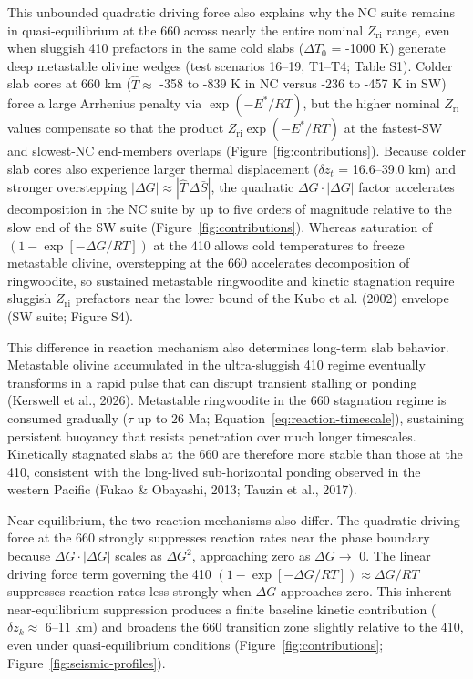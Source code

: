 \documentclass[draft,linenumbers]{agujournal2019}
\begin{document}
This unbounded quadratic driving force also explains why the NC suite
remains in quasi-equilibrium at the 660 across nearly the entire nominal
\(Z_\mathrm{ri}\) range, even when sluggish 410 prefactors in the same
cold slabs (\(\Delta T_0\) = -1000 K) generate deep metastable olivine
wedges (test scenarios 16--19, T1--T4; Table S1). Colder slab cores at
660 km (\(\hat{T} \approx\) -358 to -839 K in NC versus -236 to -457 K
in SW) force a large Arrhenius penalty via \(\exp(-E^{\ast} / RT)\), but
the higher nominal \(Z_\mathrm{ri}\) values compensate so that the
product \(Z_\mathrm{ri}\exp(-E^{\ast} / RT)\) at the fastest-SW and
slowest-NC end-members overlaps (Figure~\ref{fig:contributions}).
Because colder slab cores also experience larger thermal displacement
(\(\delta z_t\) = 16.6--39.0 km) and stronger overstepping
\(|\Delta G| \approx |\hat{T}\, \Delta \bar{S}|\), the quadratic
\(\Delta G \cdot |\Delta G|\) factor accelerates decomposition in the NC
suite by up to five orders of magnitude relative to the slow end of the
SW suite (Figure~\ref{fig:contributions}). Whereas saturation of
\((1 - \exp[-\Delta G / RT])\) at the 410 allows cold temperatures to
freeze metastable olivine, overstepping at the 660 accelerates
decomposition of ringwoodite, so sustained metastable ringwoodite and
kinetic stagnation require sluggish \(Z_\mathrm{ri}\) prefactors near
the lower bound of the Kubo et al. (2002) envelope (SW suite; Figure
S4).

This difference in reaction mechanism also determines long-term slab
behavior. Metastable olivine accumulated in the ultra-sluggish 410
regime eventually transforms in a rapid pulse that can disrupt transient
stalling or ponding (Kerswell et al., 2026). Metastable ringwoodite in
the 660 stagnation regime is consumed gradually (\(\tau\) up to 26 Ma;
Equation~\ref{eq:reaction-timescale}), sustaining persistent buoyancy
that resists penetration over much longer timescales. Kinetically
stagnated slabs at the 660 are therefore more stable than those at the
410, consistent with the long-lived sub-horizontal ponding observed in
the western Pacific (Fukao \& Obayashi, 2013; Tauzin et al., 2017).

Near equilibrium, the two reaction mechanisms also differ. The quadratic
driving force at the 660 strongly suppresses reaction rates near the
phase boundary because \(\Delta G \cdot |\Delta G|\) scales as
\(\Delta G^2\), approaching zero as \(\Delta G \to\) 0. The linear
driving force term governing the 410
\((1 - \exp[-\Delta G / RT]) \approx \Delta G / RT\) suppresses reaction
rates less strongly when \(\Delta G\) approaches zero. This inherent
near-equilibrium suppression produces a finite baseline kinetic
contribution (\(\delta z_k \approx\) 6--11 km) and broadens the 660
transition zone slightly relative to the 410, even under
quasi-equilibrium conditions (Figure~\ref{fig:contributions};
Figure~\ref{fig:seismic-profiles}).
\end{document}
